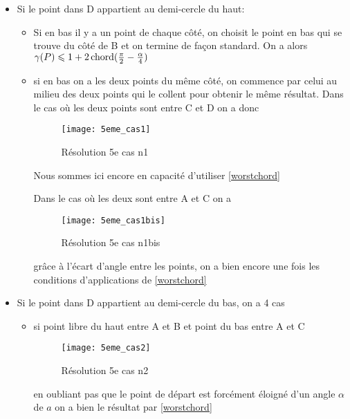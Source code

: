 \begin{itemize}

\item Si le point dans D appartient au demi-cercle du haut:

\begin{itemize}

\item Si en bas il y a un point de chaque côté, on choisit le point en bas qui se trouve du côté de B et on termine de façon standard. On a alors $\gamma(P) \leqslant 1 + 2\operatorname{chord}(\frac{\pi}{2} - \frac{\alpha}{4})$

\item si en bas on a les deux points du même côté, on commence par celui au milieu des deux points qui le collent pour obtenir le même résultat.
Dans le cas où les deux points sont entre C et D on a donc

\begin{figure}[h!]
  \centering
  \texttt{[image: 5eme\_cas1]}
  \caption{Résolution 5e cas n1}
  \label{fig:5eme_cas1}
\end{figure}

Nous sommes ici encore en capacité d'utiliser \ref{worstchord}

Dans le cas où les deux sont entre A et C on a

\begin{figure}[h!]
  \centering
  \texttt{[image: 5eme\_cas1bis]}
  \caption{Résolution 5e cas n1bis}
  \label{fig:5eme_cas1bis}
\end{figure}

grâce à l'écart d'angle entre les points, on a bien encore une fois les conditions d'applications de \ref{worstchord}

\end{itemize}

\item Si le point dans D appartient au demi-cercle du bas, on a 4 cas

\begin{itemize}

\item si point libre du haut entre A et B et point du bas entre A et C

\begin{figure}[h!]
  \centering
  \texttt{[image: 5eme\_cas2]}
  \caption{Résolution 5e cas n2}
  \label{fig:5eme_cas2}
\end{figure}

en oubliant pas que le point de départ est forcément éloigné d'un angle $\alpha$ de $a$ on a bien le résultat par \ref{worstchord}


\end{itemize}
\end{itemize}
